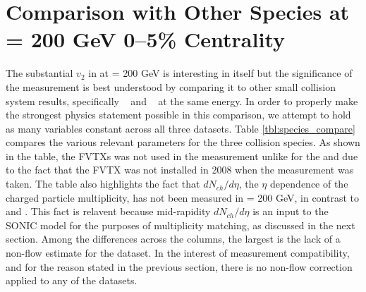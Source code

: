 \section{Comparison with Other Species at \sqsn =  200 GeV 0--5\% Centrality}
The substantial $v_2$ in \pau  at \sqsn =  200 GeV is interesting in itself but the significance of the measurement is best understood by comparing it to other small collision system results, specifically \hau~\cite{PhysRevLett.115.142301} and \dau~\cite{PhysRevLett.115.142301} at the same \sqsn energy. In order to properly make the strongest physics statement possible in this comparison, we attempt to hold as many variables constant across all three datasets. Table \ref{tbl:species_compare} compares the various relevant parameters for the three collision species. As shown in the table, the FVTXs was not used in the \dau measurement unlike for the \pau and \hau due to the fact that the FVTX was not installed in 2008 when the \dau measurement was taken. The table also highlights the fact that $dN_{ch}/d\eta$, the $\eta$ dependence of the charged particle multiplicity, has not been measured in \pau \sqsn = 200 GeV, in contrast to \hau and \dau. This fact is relavent because mid-rapidity $dN_{ch}/d\eta$ is an input to the SONIC model for the purposes of multiplicity matching, as discussed in the next section. Among the differences across the columns, the largest is the lack of a non-flow estimate for the \dau dataset. In the interest of measurement compatibility, and for the reason stated in the previous section, there is no non-flow correction applied to any of the datasets.

